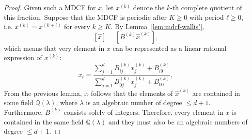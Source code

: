 \begin{proof}
  Given such a MDCF for $x$, let $x^{(k)}$ denote the $k$-th complete quotient
  of this fraction.
  Suppose that the MDCF is periodic after $K ≥ 0$ with period $ℓ ≥ 0$, i.e.
  $x^{(k)} = x^{(k+ℓ)}$ for every $k ≥ K$.
  By Lemma~\ref{lem:mdcf-wallis'},
  \[
    [\hat x] = [B^{(k)} \hat x^{(k)}],
  \]
  which means that very element in $x$ can be represented as a linear rational
  expression of $x^{(k)}$:
  \[
    x_i = \frac{∑_{j=1}^d B_{ij}^{(k)} x_j^{(k)} + B_{i0}^{(k)}}{\sum_{j=1}^d B_{0j}^{(k)} x_j^{(k)} + B_{00}^{(k)}},
  \]
  From the previous lemma, it follows that the elements of $\hat x^{(k)}$
  are contained in some field $ℚ(λ)$, where $λ$ is an algebraic number of degree $≤ d+1$.
  Furthermore, $B^{(k)}$ consists solely of integers.
  Therefore, every element in $x$ is contained in the same field $ℚ(λ)$
  and they must also be an algebraic numbers of degree $≤ d+1$.
\end{proof}

